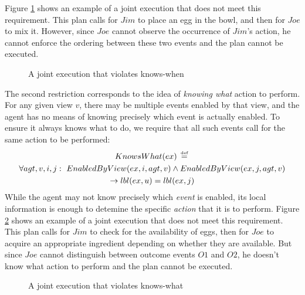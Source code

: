 Figure \ref{fig:not-knows-when} shows an example of a joint execution
that does not meet this requirement. This plan calls for $Jim$ to
place an egg in the bowl, and then for $Joe$ to mix it. However,
since $Joe$ cannot observe the occurrence of $Jim$'s action, he
cannot enforce the ordering between these two events and the plan
cannot be executed.

%
\begin{figure}

\caption{A joint execution that violates knows-when}


\label{fig:not-knows-when} 
\end{figure}


The second restriction corresponds to the idea of \emph{knowing what}
action to perform. For any given view $v$, there may be multiple
events enabled by that view, and the agent has no means of knowing
precisely which event is actually enabled. To ensure it always knows
what to do, we require that all such events call for the same action
to be performed:\begin{multline*}
KnowsWhat(ex)\,\stackrel{\mbox{\tiny def}}{=}\,\\
\forall agt,v,i,j:\,\, EnabledByView(ex,i,agt,v)\wedge EnabledByView(ex,j,agt,v)\\
\rightarrow lbl(ex,u)=lbl(ex,j)\end{multline*}
While the agent may not know precisely which \emph{event} is enabled,
its local information is enough to detemine the specific \emph{action}
that it is to perform. Figure \ref{fig:not-knows-what} shows an example
of a joint execution that does not meet this requirement. This plan
calls for $Jim$ to check for the availability of eggs, then for $Joe$
to acquire an appropriate ingredient depending on whether they are
available. But since $Joe$ cannot distinguish between outcome events
$O1$ and $O2$, he doesn't know what action to perform and the plan
cannot be executed. 

%
\begin{figure}

\caption{A joint execution that violates knows-what}


\label{fig:not-knows-what} 
\end{figure}


